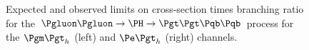 \begin{figure}
\begin{center}

\end{center}
\caption{
Expected and observed limits on cross-section times branching ratio for the
$\Pgluon\Pgluon\to\PH\to\Pgt\Pgt\Pqb\Pqb$ process for the $\mutau$ (left) and
$\etau$ (right) channels.}
\label{fig:Hhhlimits}
\end{figure} 

